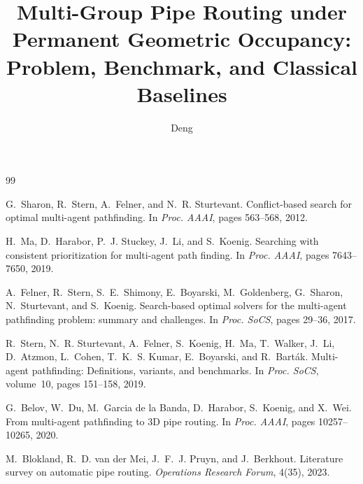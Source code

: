 \documentclass[11pt]{article}
\title{Multi-Group Pipe Routing under Permanent Geometric Occupancy:\\
Problem, Benchmark, and Classical Baselines}
\author{Deng}
\date{}
\begin{document}
\maketitle









\begin{thebibliography}{99}

G.~Sharon, R.~Stern, A.~Felner, and N.~R. Sturtevant.
\newblock Conflict-based search for optimal multi-agent pathfinding.
\newblock In \emph{Proc. AAAI}, pages 563--568, 2012.

H.~Ma, D.~Harabor, P.~J. Stuckey, J.~Li, and S.~Koenig.
\newblock Searching with consistent prioritization for multi-agent path finding.
\newblock In \emph{Proc. AAAI}, pages 7643--7650, 2019.

A.~Felner, R.~Stern, S.~E.~Shimony, E.~Boyarski, M.~Goldenberg, G.~Sharon,
N.~Sturtevant, and S.~Koenig.
\newblock Search-based optimal solvers for the multi-agent pathfinding problem:
summary and challenges.
\newblock In \emph{Proc. SoCS}, pages 29--36, 2017.

R.~Stern, N.~R. Sturtevant, A.~Felner, S.~Koenig, H.~Ma, T.~Walker,
J.~Li, D.~Atzmon, L.~Cohen, T.~K.~S. Kumar, E.~Boyarski, and R.~Bart{\'a}k.
\newblock Multi-agent pathfinding: Definitions, variants, and benchmarks.
\newblock In \emph{Proc. SoCS}, volume~10, pages 151--158, 2019.

G.~Belov, W.~Du, M.~Garcia de la Banda, D.~Harabor, S.~Koenig, and X.~Wei.
\newblock From multi-agent pathfinding to 3D pipe routing.
\newblock In \emph{Proc. AAAI}, pages 10257--10265, 2020.

M.~Blokland, R.~D. van der Mei, J.~F.~J. Pruyn, and J.~Berkhout.
\newblock Literature survey on automatic pipe routing.
\newblock \emph{Operations Research Forum}, 4(35), 2023.

\end{thebibliography}

\appendix

\end{document}
